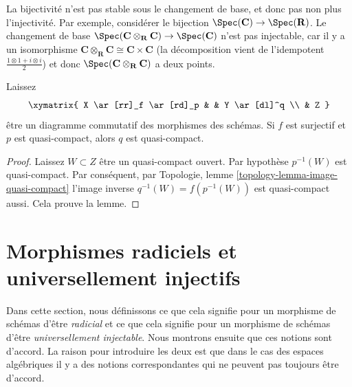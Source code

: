 \begin{example}

\label{example-injective-not-preserved-base-change}
La bijectivité n'est pas stable sous le changement de base, et donc pas non plus l'injectivité. Par exemple, considérer le bijection $\Spec(\mathbf{C}) \to \Spec(\mathbf{R})$. Le changement de base $\Spec(\mathbf{C} \otimes_{\mathbf{R}} \mathbf{C}) \to
\Spec(\mathbf{C})$ n'est pas injectable, car il y a un isomorphisme $\mathbf{C} \otimes_{\mathbf{R}} \mathbf{C} \cong \mathbf{C} \times \mathbf{C}$ (la décomposition vient de l'idempotent $\frac{1 \otimes 1 + i \otimes i}{2}$) et donc $\Spec(\mathbf{C} \otimes_{\mathbf{R}} \mathbf{C})$ a deux points.
\end{example}

\begin{lemma}

\label{lemma-surjection-from-quasi-compact}
Laissez $$
\xymatrix{
X \ar[rr]_f \ar[rd]_p & &
Y \ar[dl]^q \\
& Z
}
$$ être un diagramme commutatif des morphismes des schémas. Si $f$ est surjectif et $p$ est quasi-compact, alors $q$ est quasi-compact.
\end{lemma}

\begin{proof}
Laissez $W \subset Z$ être un quasi-compact ouvert. Par hypothèse $p^{-1}(W)$ est quasi-compact. Par conséquent, par Topologie, lemme \ref{topology-lemma-image-quasi-compact} l'image inverse $q^{-1}(W) = f(p^{-1}(W))$ est quasi-compact aussi. Cela prouve la lemme.
\end{proof}




\section{Morphismes radiciels et universellement injectifs}
\label{section-radicial}

\noindent
Dans cette section, nous définissons ce que cela signifie pour un morphisme de schémas d'être {\it radicial} et ce que cela signifie pour un morphisme de schémas d'être {\it universellement injectable}. Nous montrons ensuite que ces notions sont d'accord. La raison pour introduire les deux est que dans le cas des espaces algébriques il y a des notions correspondantes qui ne peuvent pas toujours être d'accord.

